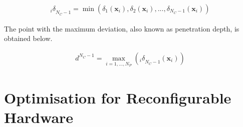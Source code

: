 



\begin{equation}
\begin{aligned}
{_i\delta}_{N_C-1} = \min \left ( \delta_{1}(\boldsymbol{x}_i),\delta_{2}(\boldsymbol{x}_i),...,\delta_{N_C-1}(\boldsymbol{x}_i) \right )
\end{aligned}
\label{eqt:dev_min}
\end{equation}

The point with the maximum deviation, also known as penetration depth, is obtained below.

\begin{equation}
\begin{aligned}
d^{N_C-1} = \max_{i=1,...,N_P} \left ( {_i\delta}_{N_C-1}(\boldsymbol{x}_i) \right )
\end{aligned}
\label{eqt:dev_max}
\end{equation}


\section{Optimisation for Reconfigurable Hardware}
\label{sec:optimisation}

